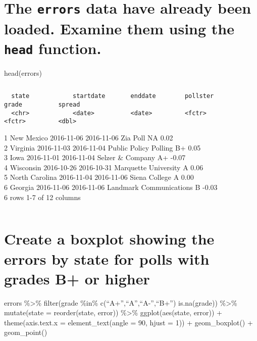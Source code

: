 \documentclass[
]{article}
\begin{document}
\hypertarget{the-errors-data-have-already-been-loaded.-examine-them-using-the-head-function.-1}{%
\section{\texorpdfstring{The \texttt{errors} data have already been
loaded. Examine them using the \texttt{head}
function.}{The errors data have already been loaded. Examine them using the head function.}}\label{the-errors-data-have-already-been-loaded.-examine-them-using-the-head-function.-1}}

head(errors)

\begin{verbatim}
\end{verbatim}

\begin{verbatim}
  state            startdate       enddate        pollster                 grade          spread
  <chr>            <date>          <date>         <fctr>                   <fctr>         <dbl>
\end{verbatim}

1 New Mexico 2016-11-06 2016-11-06 Zia Poll NA 0.02\\
2 Virginia 2016-11-03 2016-11-04 Public Policy Polling B+ 0.05\\
3 Iowa 2016-11-01 2016-11-04 Selzer \& Company A+ -0.07\\
4 Wisconsin 2016-10-26 2016-10-31 Marquette University A 0.06\\
5 North Carolina 2016-11-04 2016-11-06 Siena College A 0.00\\
6 Georgia 2016-11-06 2016-11-06 Landmark Communications B -0.03\\
6 rows \textbar{} 1-7 of 12 columns

\begin{verbatim}
\end{verbatim}

\hypertarget{create-a-boxplot-showing-the-errors-by-state-for-polls-with-grades-b-or-higher}{%
\section{Create a boxplot showing the errors by state for polls with
grades B+ or
higher}\label{create-a-boxplot-showing-the-errors-by-state-for-polls-with-grades-b-or-higher}}

errors \%\textgreater\% filter(grade \%in\%
c(``A+'',``A'',``A-'',``B+'') \textbar{} is.na(grade)) \%\textgreater\%
mutate(state = reorder(state, error)) \%\textgreater\% ggplot(aes(state,
error)) + theme(axis.text.x = element\_text(angle = 90, hjust = 1)) +
geom\_boxplot() + geom\_point()
\end{document}
